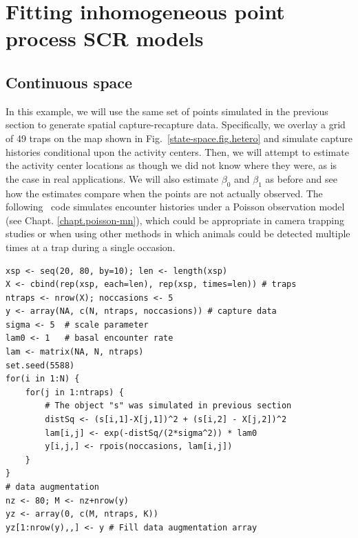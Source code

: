 \section{Fitting inhomogeneous point process SCR models}

\subsection{Continuous space}



In this example, we will use the same set of points simulated in the
previous section to generate spatial capture-recapture
data. Specifically, we overlay a grid of 49
traps on the map shown in Fig.~\ref{state-space.fig.hetero} and
simulate capture histories conditional upon the activity
centers. Then, we will attempt to estimate the activity center
locations as though we did not know where they were, as is the case in
real applications. We will also estimate $\beta_0$ and $\beta_1$ as
before and see how the estimates compare when the points are not
actually observed. The following \R~code simulates encounter histories under a
Poisson observation model (see Chapt. \ref{chapt.poisson-mn}), which could be appropriate in camera
trapping studies or when using other methods in which animals could
be detected multiple times at a trap during a single occasion.

\begin{small}
\begin{verbatim}
xsp <- seq(20, 80, by=10); len <- length(xsp)
X <- cbind(rep(xsp, each=len), rep(xsp, times=len)) # traps
ntraps <- nrow(X); noccasions <- 5
y <- array(NA, c(N, ntraps, noccasions)) # capture data
sigma <- 5  # scale parameter
lam0 <- 1   # basal encounter rate
lam <- matrix(NA, N, ntraps)
set.seed(5588)
for(i in 1:N) {
    for(j in 1:ntraps) {
        # The object "s" was simulated in previous section
        distSq <- (s[i,1]-X[j,1])^2 + (s[i,2] - X[j,2])^2
        lam[i,j] <- exp(-distSq/(2*sigma^2)) * lam0
        y[i,j,] <- rpois(noccasions, lam[i,j])
    }
}
# data augmentation
nz <- 80; M <- nz+nrow(y)
yz <- array(0, c(M, ntraps, K))
yz[1:nrow(y),,] <- y # Fill data augmentation array
\end{verbatim}
\end{small}


